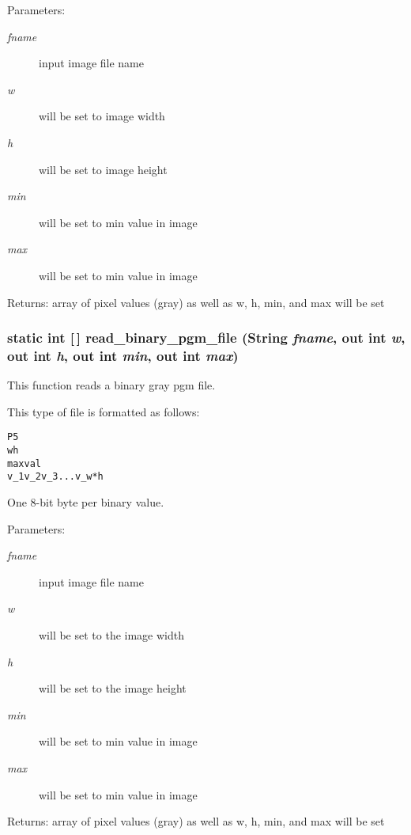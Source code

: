 \begin{Desc}
\item[Parameters:]
\begin{description}
\item[{\em fname}]input image file name \item[{\em w}]will be set to image width \item[{\em h}]will be set to image height \item[{\em min}]will be set to min value in image \item[{\em max}]will be set to min value in image\end{description}
\end{Desc}
\begin{Desc}
\item[Returns:]array of pixel values (gray) as well as w, h, min, and max will be set \end{Desc}
\subsubsection{\setlength{\rightskip}{0pt plus 5cm}static int [$\,$] read\_\-binary\_\-pgm\_\-file (String {\em fname}, out int {\em w}, out int {\em h}, out int {\em min}, out int {\em max})\hspace{0.3cm}{\tt  [static, protected]}}\label{class_c_s_image_viewer_1_1pnm_helper_4998c73034df68afc294e0be9235e2cc}


This function reads a binary gray pgm file. 

This type of file is formatted as follows: \small\begin{alltt}
    P5
    w h
    maxval
    v\_1 v\_2 v\_3 . . . v\_w*h
  \end{alltt}\normalsize 
 One 8-bit byte per binary value.

\begin{Desc}
\item[Parameters:]
\begin{description}
\item[{\em fname}]input image file name \item[{\em w}]will be set to the image width \item[{\em h}]will be set to the image height \item[{\em min}]will be set to min value in image \item[{\em max}]will be set to min value in image\end{description}
\end{Desc}
\begin{Desc}
\item[Returns:]array of pixel values (gray) as well as w, h, min, and max will be set \end{Desc}

